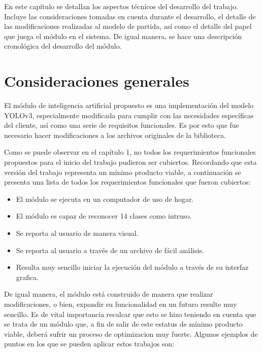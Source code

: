 En este capítulo se detallan los aspectos técnicos del desarrollo del trabajo. Incluye las consideraciones tomadas en cuenta durante el desarrollo, el detalle de las modificaciones realizadas al modelo de partida, así como el detalle del papel que juega el módulo en el sistema. De igual manera, se hace una descripción cronológica del desarrollo del módulo.    

\section{Consideraciones generales}

El módulo de inteligencia artificial propuesto es una implementación del modelo YOLOv3, especialmente modificada para cumplir con las necesidades específicas del cliente, así como una serie de requisitos funcionales.  Es por esto que fue necesario hacer modificaciones a los archivos originales de la biblioteca. 

Como se puede observar en el capítulo 1, no todos los requerimientos funcionales propuestos para el inicio del trabajo pudieron ser cubiertos. Recordando que esta versión del trabajo representa un mínimo producto viable, a continuación se presenta una lista de todos los requerimientos funcionales que fueron cubiertos:

\begin{itemize}

	\item El módulo se ejecuta en un computador de uso de hogar. 
	\item El módulo es capaz de reconocer 14 clases como intruso. 
	\item Se reporta al usuario de manera visual. 
	\item Se reporta al usuario a través de un archivo de fácil análisis.
	\item Resulta muy sencillo iniciar la ejecución del módulo a través de su interfaz grafica. 

\end{itemize}

De igual manera, el módulo está construido de manera que realizar modificaciones, o bien, expandir su funcionalidad en un futuro resulte muy sencillo. Es de vital importancia recalcar que esto se hizo teniendo en cuenta que se trata de un módulo que, a fin de salir de este estatus de mínimo producto viable, deberá sufrir un proceso de optimizacion muy fuerte. Algunos ejemplos de puntos en los que se pueden aplicar estos trabajos son:

